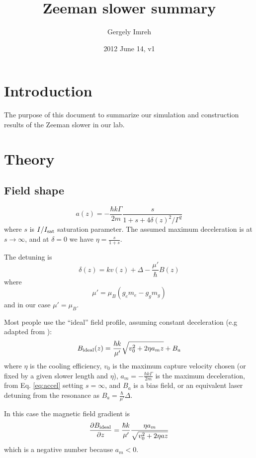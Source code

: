 \documentclass[12pt,a4paper]{article}
\author{Gergely Imreh}
\title{Zeeman slower summary}
\date{2012 June 14, v1}
\begin{document}
\maketitle

\section{Introduction}

The purpose of this document to summarize our simulation and construction results of the Zeeman slower in our lab.

\section{Theory}

\subsection{Field shape}

\begin{equation}
a(z) = -\frac{\hbar k \Gamma}{2 m} \frac{s}{1 + s + 4 \delta(z)^2 / \Gamma^2}
\label{eq:accel}
\end{equation}
where $s$ is $I/I_{\rm sat}$ saturation parameter. The assumed maximum deceleration is at $s \rightarrow \infty$, and at $\delta = 0$ we have $\eta = \frac{s}{1 + s}$.

The detuning is 
\begin{equation}
\delta(z) = k v(z) + \Delta - \frac{\mu'}{\hbar} B(z)
\end{equation}
where 
\begin{equation}
\mu' = \mu_{B}(g_e m_e - g_g m_g)
\end{equation}
and in our case $\mu' = \mu_{B}$.

Most people use the ``ideal'' field profile, assuming constant deceleration (e.g adapted from \cite{Bell2010}):
\begin{equation}
B_{\rm ideal}(z) = \frac{\hbar k}{\mu'}\sqrt{v_0^2 + 2 \eta a_m z} + B_a
\label{eq:bideal}
\end{equation}
where $\eta$ is the cooling efficiency, $v_0$ is the maximum capture velocity chosen (or fixed by a given slower length and $\eta$), $a_m = -\frac{\hbar k \Gamma}{2 m}$ is the maximum deceleration, from Eq. \ref{eq:accel} setting $s = \infty$, and $B_a$ is a bias field, or an equivalent laser detuning from the resonance as $B_a = \frac{\hbar}{\mu'} \Delta$.

In this case the magnetic field gradient is
\begin{equation}
\frac{\partial B_{\rm ideal}}{\partial z} = \frac{\hbar k}{\mu'} \frac{\eta a_m}{\sqrt{v_0^2 + 2 \eta a z}}
\end{equation}
which is a negative number because $a_m < 0$.
\end{document}
